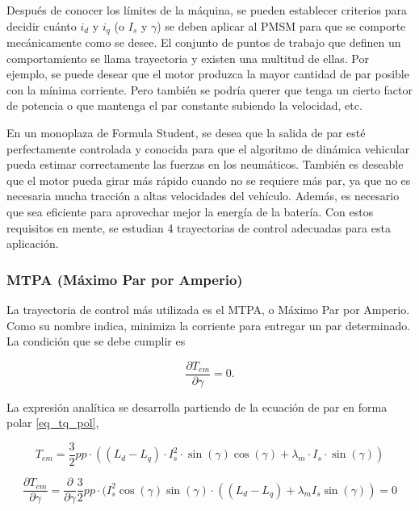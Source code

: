 Después de conocer los límites de la máquina, se pueden establecer criterios para decidir cuánto \(i_d\) y \(i_q\) (o \(I_s\) y \(\gamma\)) se deben aplicar al PMSM para que se comporte mecánicamente como se desee. El conjunto de puntos de trabajo que definen un comportamiento se llama trayectoria y existen una multitud de ellas. Por ejemplo, se puede desear que el motor produzca la mayor cantidad de par posible con la mínima corriente. Pero también se podría querer que tenga un cierto factor de potencia o que mantenga el par constante subiendo la velocidad, etc.

En un monoplaza de Formula Student, se desea que la salida de par esté perfectamente controlada y conocida para que el algoritmo de dinámica vehicular pueda estimar correctamente las fuerzas en los neumáticos. También es deseable que el motor pueda girar más rápido cuando no se requiere más par, ya que no es necesaria mucha tracción a altas velocidades del vehículo. Además, es necesario que sea eficiente para aprovechar mejor la energía de la batería. Con estos requisitos en mente, se estudian 4 trayectorias de control adecuadas para esta aplicación.

\subsubsection{MTPA (Máximo Par por Amperio)}

La trayectoria de control más utilizada es el MTPA, o Máximo Par por Amperio. Como su nombre indica, minimiza la corriente para entregar un par determinado. La condición que se debe cumplir es

\begin{equation}
	\frac{\partial T_{em}}{\partial \gamma} = 0 \text{.}
\end{equation}


La expresión analítica se desarrolla partiendo de la ecuación de par en forma polar \ref{eq_tq_pol},

\begin{equation*}
	T_{em} = \frac{3}{2}pp\cdot((L_d - L_q)\cdot I_s^2 \cdot \sin(\gamma)\cos(\gamma) + \lambda_m\cdot I_s\cdot \sin(\gamma))
\end{equation*}


\begin{equation}
\frac{\partial T_{em}}{\partial \gamma} = \frac{\partial}{\partial \gamma} \frac{3}{2}pp\cdot(I_s^2 \cos(\gamma)\sin(\gamma)\cdot((L_d - L_q) + \lambda_m I_s \sin(\gamma)) = 0
\end{equation}

